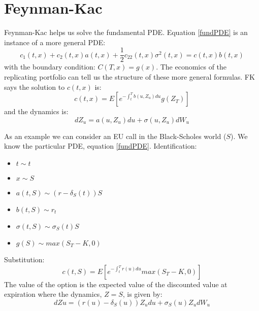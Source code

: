 
\section{Feynman-Kac}

Feynman-Kac helps us solve the fundamental PDE. Equation \ref{fundPDE} is an
instance of a more general PDE:
\[c_1(t,x)+c_2(t,x)a(t,x)+\frac{1}{2}c_{22}(t,x)\sigma^2(t,x)=c(t,x)b(t,x)\]
with the boundary condition: $C(T,x)=g(x)$.
The economics of the replicating portfolio can tell us the structure of these
more general formulas.
FK says the solution to $c(t,x)$ is:
\begin{equation} \label{feynkacGen}
    c(t,x)=E\left[ e^{-\int_t^Tb(u,Z_u)du}g(Z_T) \right]
\end{equation}
and the dynamics is:
\[dZ_u=a(u,Z_u)du+\sigma(u,Z_u)dW_u\]

As an example we can consider an EU call in the Black-Scholes world ($S$). We
know the particular PDE, equation \ref{fundPDE}. Identification:
\begin{itemize}
    \item $t\sim t$
    \item $x\sim S$
    \item $a(t,S)\sim (r-\delta_S(t))S$
    \item $b(t,S)\sim r_t$
    \item $\sigma(t,S)\sim \sigma_S(t)S$
    \item $g(S)\sim max(S_T-K,0)$
\end{itemize}
Substitution:
\begin{equation} \label{feynkacPar}
    c(t,S)=E\left[ e^{-\int_t^Tr(u)du}max(S_T-K,0) \right]
\end{equation}
The value of the option is the expected value of the discounted value at
expiration where the dynamics, $Z=S$, is given by:
\begin{equation} \label{feynkacParDyn}
    dZu=(r(u)-\delta_S(u))Z_udu+\sigma_S(u)Z_udW_u
\end{equation}

